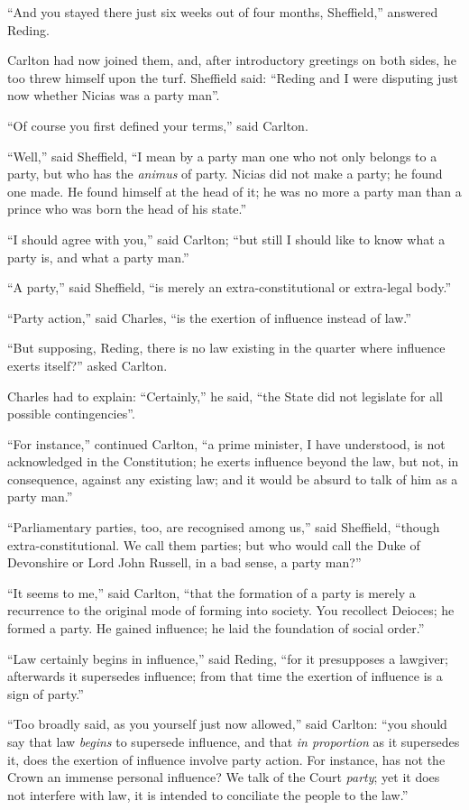 ``And you stayed there just six weeks out of four months,
Sheffield,'' answered Reding.

Carlton had now joined them, and, after introductory greetings on
both sides, he too threw himself upon the turf. Sheffield said: ``Reding
and I were disputing just now whether Nicias was a party man''.

``Of course you first defined your terms,'' said Carlton.

``Well,'' said Sheffield, ``I mean by a party man one
who not only belongs to a party, but who has the \emph{animus} of
party. Nicias did not make a party; he found one made. He found
himself at the head of it; he was no more a party man than a prince
who was born the head of his state.''

``I should agree with you,'' said Carlton; ``but still
I should like to know what a party is, and what a party man.''

``A party,'' said Sheffield, ``is merely an
extra-constitutional or extra-legal body.''

``Party action,'' said Charles, ``is the exertion of
influence instead of law.''

``But supposing, Reding, there is no law existing in the
quarter where influence exerts itself?'' asked Carlton.

Charles had to explain: ``Certainly,'' he said, ``the
State did not legislate for all possible contingencies''.

``For instance,'' continued Carlton, ``a prime
minister, I have understood, is not acknowledged in the Constitution;
he exerts influence beyond the law, but not, in consequence, against
any existing law; and it would be absurd to talk of him as a party
man.''

``Parliamentary parties, too, are recognised among us,''
said Sheffield, ``though extra-constitutional. We call them
parties; but who would call the Duke of Devonshire or Lord John
Russell, in a bad sense, a party man?''

``It seems to me,'' said Carlton, ``that the formation
of a party is merely a recurrence to the original mode of
forming into society. You recollect Deioces; he formed a party. He
gained influence; he laid the foundation of social order.''

``Law certainly begins in influence,'' said Reding,
``for it presupposes a lawgiver; afterwards it supersedes
influence; from that time the exertion of influence is a sign of
party.''

``Too broadly said, as you yourself just now allowed,''
said Carlton: ``you should say that law \emph{begins} to supersede
influence, and that \emph{in proportion} as it supersedes it, does the
exertion of influence involve party action. For instance, has not the
Crown an immense personal influence? We talk of the Court \emph{party};
yet it does not interfere with law, it is intended to conciliate the
people to the law.''

